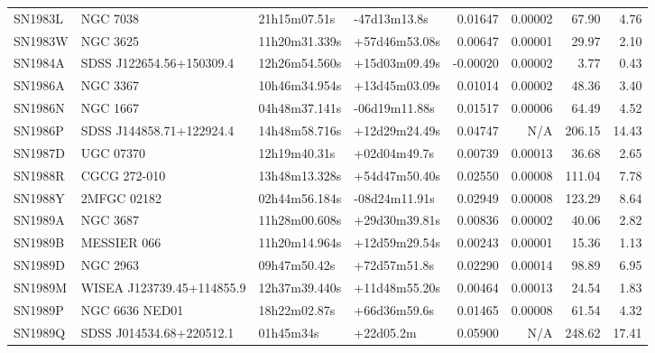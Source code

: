 \begin{longtable}{llllrrrr}
SN1983L          &                        NGC 7038 &    21h15m07.51s &    -47d13m13.8s &  0.01647 &  0.00002 &    67.90 &        4.76 \\
SN1983W          &                        NGC 3625 &   11h20m31.339s &   +57d46m53.08s &  0.00647 &  0.00001 &    29.97 &        2.10 \\
SN1984A          &        SDSS J122654.56+150309.4 &   12h26m54.560s &   +15d03m09.49s & -0.00020 &  0.00002 &     3.77 &        0.43 \\
SN1986A          &                        NGC 3367 &   10h46m34.954s &   +13d45m03.09s &  0.01014 &  0.00002 &    48.36 &        3.40 \\
SN1986N          &                        NGC 1667 &   04h48m37.141s &   -06d19m11.88s &  0.01517 &  0.00006 &    64.49 &        4.52 \\
SN1986P          &        SDSS J144858.71+122924.4 &   14h48m58.716s &   +12d29m24.49s &  0.04747 &      N/A &   206.15 &       14.43 \\
SN1987D          &                       UGC 07370 &    12h19m40.31s &    +02d04m49.7s &  0.00739 &  0.00013 &    36.68 &        2.65 \\
SN1988R          &                    CGCG 272-010 &   13h48m13.328s &   +54d47m50.40s &  0.02550 &  0.00008 &   111.04 &        7.78 \\
SN1988Y          &                     2MFGC 02182 &   02h44m56.184s &   -08d24m11.91s &  0.02949 &  0.00008 &   123.29 &        8.64 \\
SN1989A          &                        NGC 3687 &   11h28m00.608s &   +29d30m39.81s &  0.00836 &  0.00002 &    40.06 &        2.82 \\
SN1989B          &                     MESSIER 066 &   11h20m14.964s &   +12d59m29.54s &  0.00243 &  0.00001 &    15.36 &        1.13 \\
SN1989D          &                        NGC 2963 &    09h47m50.42s &    +72d57m51.8s &  0.02290 &  0.00014 &    98.89 &        6.95 \\
SN1989M          &       WISEA J123739.45+114855.9 &   12h37m39.440s &   +11d48m55.20s &  0.00464 &  0.00013 &    24.54 &        1.83 \\
SN1989P          &                  NGC 6636 NED01 &    18h22m02.87s &    +66d36m59.6s &  0.01465 &  0.00008 &    61.54 &        4.32 \\
SN1989Q          &        SDSS J014534.68+220512.1 &       01h45m34s &       +22d05.2m &  0.05900 &      N/A &   248.62 &       17.41 \\

\end{longtable}
